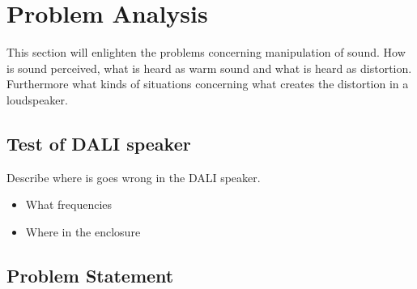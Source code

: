 \chapter{Problem Analysis}

This section will enlighten the problems concerning manipulation of sound. How is sound perceived, what is heard as warm sound and what is heard as distortion. Furthermore what kinds of situations concerning what creates the distortion in a loudspeaker. 

\section{Test of DALI speaker}

Describe where is goes wrong in the DALI speaker.

\begin{itemize}
\item What frequencies 
\item Where in the enclosure
\end{itemize}








\section{Problem Statement}